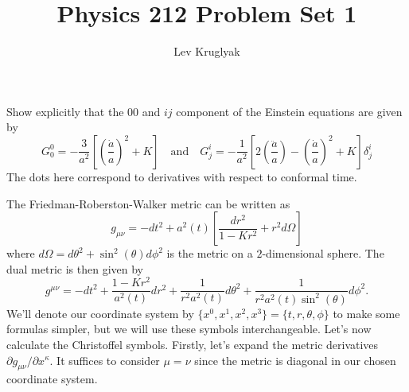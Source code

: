 \documentclass{lkx_pset}
\title{Physics 212 Problem Set 1}
\author{Lev Kruglyak}
\begin{document}
\maketitle

\begin{problem}{1}
Show explicitly that the $00$ and $ij$ component of the Einstein equations are given by
\[
	G^0_0 = -\frac{3}{a^2}\left[\left(\frac{\dot{a}}{a}\right)^2+ K\right]
	\quad\textrm{and}\quad
	G^i_j = -\frac{1}{a^2}\left[2\left(\frac{\ddot{a}}{a}\right)-\left(\frac{\dot{a}}{a}\right)^2+ K\right]\delta^i_j
\]
The dots here correspond to derivatives with respect to conformal time.
\end{problem}
\begin{solution}
	The Friedman-Roberston-Walker metric can be written as
	\[
		g_{\mu\nu} = -dt^2 +a^2(t)\left[\frac{dr^2}{1-Kr^2}+r^2d\Omega\right]
	\]
	where $d\Omega = d\theta^2 + \sin^2(\theta)d\phi^2$ is the metric on a $2$-dimensional sphere. The dual metric is then given by
	\[
		g^{\mu\nu} = -dt^2 +\frac{1-Kr^2}{a^2(t)}dr^2 + \frac{1}{r^2a^2(t)}d\theta^2 + \frac{1}{r^2a^2(t)\sin^2(\theta)}d\phi^2.
	\]
	We'll denote our coordinate system by $\{x^0, x^1, x^2, x^3\} = \{t, r, \theta, \phi\}$ to make some formulas simpler, but we will use these symbols interchangeable. Let's now calculate the Christoffel symbols. Firstly, let's expand the metric derivatives $\partial g_{\mu\nu}/\partial x^\kappa$. It suffices to consider $\mu=\nu$ since the metric is diagonal in our chosen coordinate system.


\end{solution}
\end{document}
